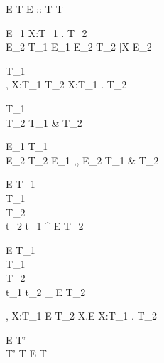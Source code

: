  {  \Gamma \vdash
  E \Leftarrow T  } { \Gamma \vdash E :: T \Rightarrow T  }

 { \Gamma \vdash E_1 \Rightarrow \Pi X:T_1 . T_2  \\
  \Gamma \vdash E_2 \Leftarrow T_1  } { \Gamma \vdash E_1 E_2
  \Rightarrow T_2 [X \mapsto E_2]  }

 { \Gamma \vdash T_1 \Leftarrow \star {} \\ \Gamma,
  X:T_1 \vdash T_2 \Leftarrow \star {} } { \Gamma \vdash \Pi X:T_1 .
  T_2 \Rightarrow \star {} }

 { \Gamma \vdash T_1 \Leftarrow \star {} \\ \Gamma
  \vdash T_2 \Leftarrow \star {} } { \Gamma \vdash T_1 \& T_2
  \Rightarrow \star {} }

 { \Gamma \vdash E_1 \Rightarrow T_1  \\ \Gamma
  \vdash E_2 \Rightarrow T_2  } { \Gamma \vdash E_1 ,, E_2
  \Rightarrow T_1 \& T_2  }


 { \Gamma \vdash E \Rightarrow  T_1  \\ \Gamma \vdash T_1 \Leftarrow
  \star {} \\ \Gamma \vdash T_2 \Leftarrow \star {} \\ t_2
  \longrightarrow t_1 } { \Gamma \vdash {}^{\uparrow} E \Leftarrow T_2
   }

 { \Gamma \vdash E \Rightarrow T_1  \\ \Gamma \vdash T_1 \Leftarrow
  \star {} \\ \Gamma \vdash T_2 \Leftarrow \star {} \\ t_1
  \longrightarrow t_2 } { \Gamma \vdash {}_{\downarrow} E \Leftarrow T_2
   }

 { \Gamma, X:T_1 \vdash E \Leftarrow T_2  } { \Gamma
  \vdash \lambda X.E \Leftarrow \Pi X:T_1 . T_2  }

 { \Gamma \vdash E \Rightarrow T'  \\ T'
  \leq T  } { \Gamma \vdash E \Leftarrow T  }

